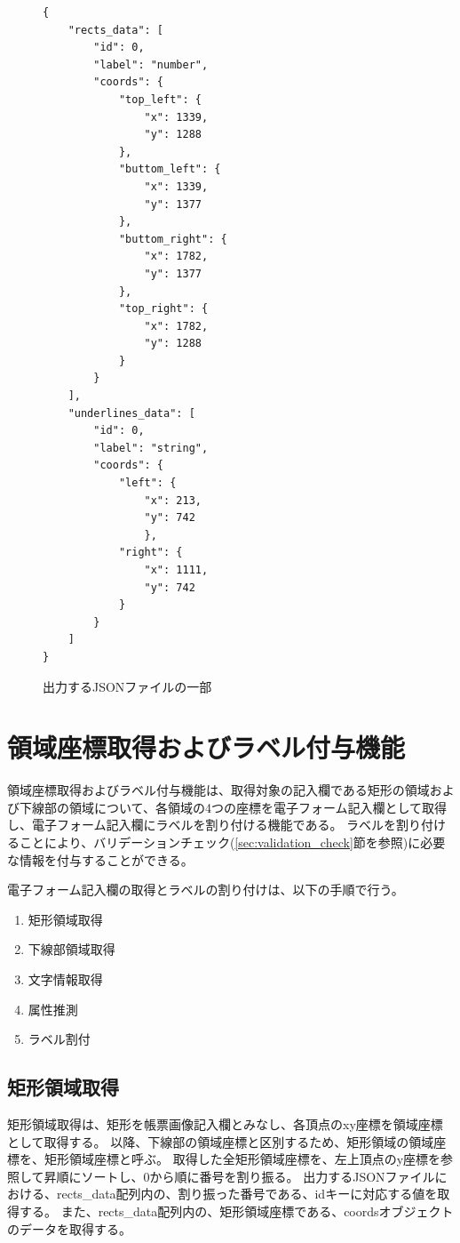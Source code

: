 \lstset{language=}
\begin{figure}[t]
    \begin{lstlisting}
{
    "rects_data": [
        "id": 0, 
        "label": "number",
        "coords": {
            "top_left": {
                "x": 1339,
                "y": 1288
            },
            "buttom_left": {
                "x": 1339,
                "y": 1377
            },
            "buttom_right": {
                "x": 1782,
                "y": 1377
            },
            "top_right": {
                "x": 1782,
                "y": 1288
            }
        }
    ],
    "underlines_data": [
        "id": 0,
        "label": "string",
        "coords": {
            "left": {
                "x": 213,
                "y": 742
                },
            "right": {
                "x": 1111,
                "y": 742
            }
        }
    ]
}
    \end{lstlisting}
    \caption{出力するJSONファイルの一部}\label{fig:example_output_json}
\end{figure}

\section{領域座標取得およびラベル付与機能}\label{sec:eform_write_space_obtainment_feature}
領域座標取得およびラベル付与機能は、取得対象の記入欄である矩形の領域および下線部の領域について、各領域の4つの座標を電子フォーム記入欄として取得し、電子フォーム記入欄にラベルを割り付ける機能である。
ラベルを割り付けることにより、バリデーションチェック(\ref{sec:validation_check}節を参照)に必要な情報を付与することができる。

電子フォーム記入欄の取得とラベルの割り付けは、以下の手順で行う。

\begin{enumerate}
    \item 矩形領域取得
    \item 下線部領域取得
    \item 文字情報取得
    \item 属性推測
    \item ラベル割付
\end{enumerate}

\subsection{矩形領域取得}\label{subsec:rect_coords_obtainment}
矩形領域取得は、矩形を帳票画像記入欄とみなし、各頂点のxy座標を領域座標として取得する。
以降、下線部の領域座標と区別するため、矩形領域の領域座標を、矩形領域座標と呼ぶ。
取得した全矩形領域座標を、左上頂点のy座標を参照して昇順にソートし、0から順に番号を割り振る。
出力するJSONファイルにおける、rects\_data配列内の、割り振った番号である、idキーに対応する値を取得する。
また、rects\_data配列内の、矩形領域座標である、coordsオブジェクトのデータを取得する。

